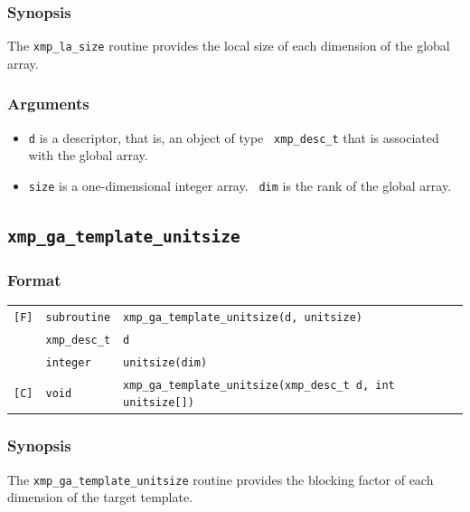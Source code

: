 \subsubsection*{Synopsis}

The {\tt xmp\_la\_size} routine provides the local size of each
dimension of the global array.

\subsubsection*{Arguments}

\begin{itemize}
 \item {\tt d} is a descriptor, that is, an object of type {\tt
       xmp\_desc\_t} that is associated with the global array.
 \item {\tt size} is a one-dimensional integer array. {\tt
       dim} is the rank of the global array.
\end{itemize}

\subsection{\tt xmp\_ga\_template\_unitsize}

\subsubsection*{Format}

\begin{tabular}{lll}

\verb![F]!&  {\tt subroutine}& {\tt xmp\_ga\_template\_unitsize(d, unitsize)}\\
          & {\tt xmp\_desc\_t} & {\tt d}\\
          & {\tt integer} & {\tt unitsize(dim)}\\

\verb![C]!&  {\tt void}& {\tt xmp\_ga\_template\_unitsize(xmp\_desc\_t d, int unitsize[])}\\

\end{tabular}

\subsubsection*{Synopsis}

The {\tt xmp\_ga\_template\_unitsize} routine provides the blocking
factor of each dimension of the target template.

